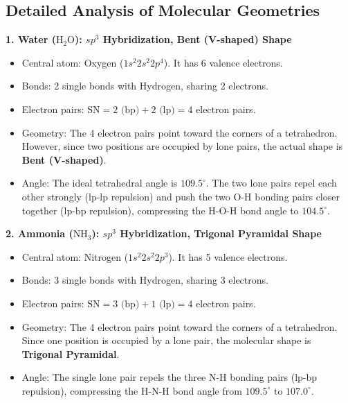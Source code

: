 \documentclass[12pt,a4paper]{article}
\begin{document}
\subsection{Detailed Analysis of Molecular Geometries}

\textbf{1. Water ($\text{H}_2\text{O}$): $sp^3$ Hybridization, Bent (V-shaped) Shape}
\begin{itemize}[leftmargin=*, itemsep=1pt]
  \item Central atom: Oxygen ($1s^2 2s^2 2p^4$). It has 6 valence electrons.
  \item Bonds: 2 single bonds with Hydrogen, sharing 2 electrons.
  \item Electron pairs: $\text{SN} = 2\text{ (bp)} + 2\text{ (lp)} = 4$ electron pairs.
  \item Geometry: The 4 electron pairs point toward the corners of a tetrahedron. However, since two positions are occupied by lone pairs, the actual shape is \textbf{Bent (V-shaped)}.
  \item Angle: The ideal tetrahedral angle is $109.5^\circ$. The two lone pairs repel each other strongly ($\text{lp-lp}$ repulsion) and push the two $\text{O-H}$ bonding pairs closer together ($\text{lp-bp}$ repulsion), compressing the $\text{H-O-H}$ bond angle to $104.5^\circ$.
\end{itemize}

\textbf{2. Ammonia ($\text{NH}_3$): $sp^3$ Hybridization, Trigonal Pyramidal Shape}
\begin{itemize}[leftmargin=*, itemsep=1pt]
  \item Central atom: Nitrogen ($1s^2 2s^2 2p^3$). It has 5 valence electrons.
  \item Bonds: 3 single bonds with Hydrogen, sharing 3 electrons.
  \item Electron pairs: $\text{SN} = 3\text{ (bp)} + 1\text{ (lp)} = 4$ electron pairs.
  \item Geometry: The 4 electron pairs point toward the corners of a tetrahedron. Since one position is occupied by a lone pair, the molecular shape is \textbf{Trigonal Pyramidal}.
  \item Angle: The single lone pair repels the three $\text{N-H}$ bonding pairs ($\text{lp-bp}$ repulsion), compressing the $\text{H-N-H}$ bond angle from $109.5^\circ$ to $107.0^\circ$.
\end{itemize}
\end{document}
